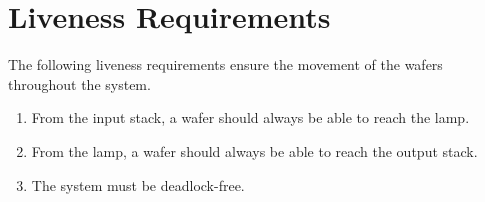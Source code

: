 \section{Liveness Requirements}

The following liveness requirements ensure the movement of the wafers throughout the system.

\begin{enumerate}
    \item From the input stack, a wafer should always be able to reach the lamp.
    \item From the lamp, a wafer should always be able to reach the output stack.
    \item The system must be deadlock-free.
\end{enumerate}